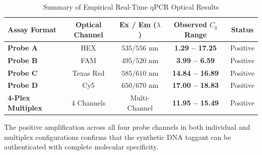 \begin{table}[H]
\centering
\small
\caption{Summary of Empirical Real-Time qPCR Optical Results}
\label{tab:empirical_probe_data}
\begin{tabularx}{\textwidth}{X c c c c}
\toprule
\textbf{Assay Format} & \textbf{Optical Channel} & \textbf{Ex / Em ($\lambda$)} & \textbf{Observed $C_q$ Range} & \textbf{Status} \\
\midrule
\textbf{Probe A} & HEX & $535 / 556\text{ nm}$ & \textbf{1.29 -- 17.25} & Positive \\
\textbf{Probe B} & FAM & $495 / 520\text{ nm}$ & \textbf{3.99 -- 6.59} & Positive \\
\textbf{Probe C} & Texas Red & $585 / 610\text{ nm}$ & \textbf{14.84 -- 16.89} & Positive \\
\textbf{Probe D} & Cy5 & $650 / 670\text{ nm}$ & \textbf{17.00 -- 18.83} & Positive \\
\midrule
\textbf{4-Plex Multiplex} & 4 Channels & Multi-Channel & \textbf{11.95 -- 15.49} & Positive \\
\bottomrule
\end{tabularx}
\end{table}

The positive amplification across all four probe channels in both individual and multiplex configurations confirms that the synthetic DNA taggant can be authenticated with complete molecular specificity.
